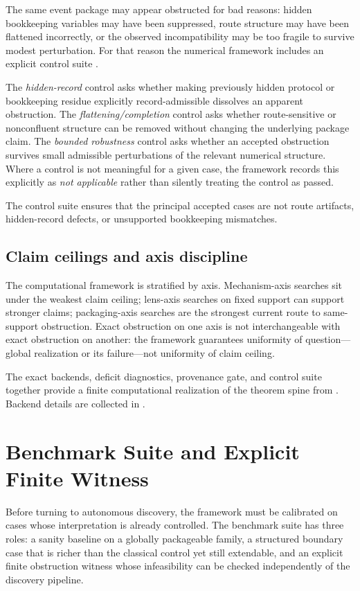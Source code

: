 \documentclass[11pt]{article}
\theoremstyle{definition}
\begin{document}
The same event package may appear obstructed for bad reasons: hidden bookkeeping variables may have been suppressed, route structure may have been flattened incorrectly, or the observed incompatibility may be too fragile to survive modest perturbation. For that reason the numerical framework includes an explicit control suite \citep{Tsiokos2026NoGo,Tsiokos2026ProtocolTrap}.

The \emph{hidden-record} control asks whether making previously hidden protocol or bookkeeping residue explicitly record-admissible dissolves an apparent obstruction. The \emph{flattening/completion} control asks whether route-sensitive or nonconfluent structure can be removed without changing the underlying package claim. The \emph{bounded robustness} control asks whether an accepted obstruction survives small admissible perturbations of the relevant numerical structure. Where a control is not meaningful for a given case, the framework records this explicitly as \emph{not applicable} rather than silently treating the control as passed.

The control suite ensures that the principal accepted cases are not route artifacts, hidden-record defects, or unsupported bookkeeping mismatches.

\subsection{Claim ceilings and axis discipline}

The computational framework is stratified by axis. Mechanism-axis searches sit under the weakest claim ceiling; lens-axis searches on fixed support can support stronger claims; packaging-axis searches are the strongest current route to same-support obstruction. Exact obstruction on one axis is not interchangeable with exact obstruction on another: the framework guarantees uniformity of question---global realization or its failure---not uniformity of claim ceiling.

The exact backends, deficit diagnostics, provenance gate, and control suite together provide a finite computational realization of the theorem spine from . Backend details are collected in .

\section{Benchmark Suite and Explicit Finite Witness}\label{sec:benchmarks}
Before turning to autonomous discovery, the framework must be calibrated on cases whose interpretation is already controlled. The benchmark suite has three roles: a sanity baseline on a globally packageable family, a structured boundary case that is richer than the classical control yet still extendable, and an explicit finite obstruction witness whose infeasibility can be checked independently of the discovery pipeline.
\end{document}
